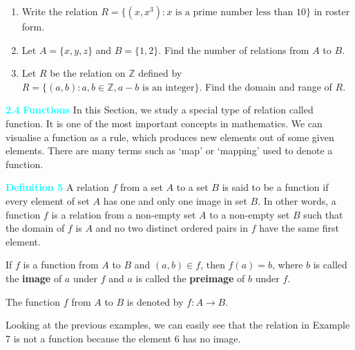 \documentclass[11pt]{article}
\begin{document}
\begin{enumerate}
    \item Write the relation $R = \{(x, x^3) : x \text{ is a prime number less than } 10\}$ in roster form.

    \item Let $A = \{x, y, z\}$ and $B = \{1, 2\}$. Find the number of relations from $A$ to $B$.

    \item Let $R$ be the relation on $\mathbb{Z}$ defined by $R = \{(a, b) : a, b \in \mathbb{Z}, a - b \text{ is an integer}\}$. Find the domain and range of $R$.
\end{enumerate}

\noindent
\colorbox{ncertblue}{\textcolor{cyan}{\textbf{2.4}}}\hspace{6pt}
\textcolor{cyan}{\textbf{Functions}}
In this Section, we study a special type of relation called function. It is one of the most important concepts in mathematics. We can visualise a function as a rule, which produces new elements out of some given elements. There are many terms such as ‘map’ or ‘mapping’ used to denote a function.

\vspace{10pt}
\colorbox{ncertblue}{\textcolor{cyan}{\textbf{Definition 5}}}\hspace{0.5em}
\noindent A relation $f$ from a set $A$ to a set $B$ is said to be a function if every element of set $A$ has one and only one image in set $B$.
\vspace{5pt}
 In other words, a function $f$ is a relation from a non-empty set $A$ to a non-empty set $B$ such that the domain of $f$ is $A$ and no two distinct ordered pairs in $f$ have the same first element.
\vspace{5pt}

If $f$ is a function from $A$ to $B$ and $(a, b) \in f$, then $f(a) = b$, where $b$ is called the \textbf{image} of $a$ under $f$ and $a$ is called the \textbf{preimage} of $b$ under $f$.

 The function $f$ from $A$ to $B$ is denoted by $f: A \to B$.
\vspace{10pt}

 Looking at the previous examples, we can easily see that the relation in Example 7 is not a function because the element 6 has no image.
\end{document}
